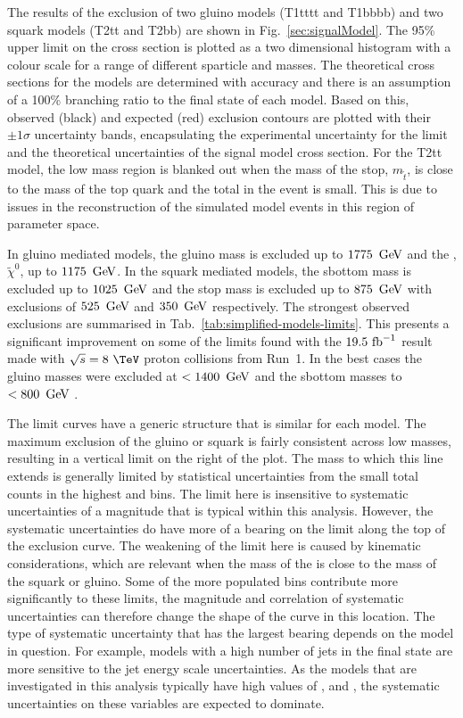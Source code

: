 The results of the exclusion of two gluino models (T1tttt and T1bbbb)
and two squark models (T2tt and T2bb) are shown in
Fig.~\ref{sec:signalModel}. The 95\% \CL upper limit on the cross
section is plotted as a two dimensional histogram with a colour scale
for a range of different sparticle and \LSP masses. The theoretical
cross sections for the models are determined with \NLO
accuracy and there is an assumption of a 100\% branching ratio to the
final state of each model. Based on this, observed (black) and
expected (red) exclusion contours are plotted with their $\pm1\sigma$
uncertainty bands, encapsulating the experimental uncertainty for the
limit and the theoretical uncertainties of the signal model cross
section. For the T2tt model, the low mass region is blanked out when
the mass of the stop, $m_{\tilde{t}}$, is close to the mass of the top
quark and the total \MET in the event is small. This is due to issues
in the \MET reconstruction of the simulated \SUSY model events in this
region of parameter space.

In gluino mediated models, the gluino mass is excluded up to 
$1775~\mathrm{\,Ge\kern -0.1em V}$ and the \LSP, $\tilde{\chi}^0$, up to $1175~\mathrm{\,Ge\kern -0.1em V}$. In the
squark mediated models, the sbottom mass is excluded up to $1025~\mathrm{\,Ge\kern -0.1em V}$
and the stop mass is excluded up to $875~\mathrm{\,Ge\kern -0.1em V}$ with \LSP exclusions of
$525~\mathrm{\,Ge\kern -0.1em V}$ and $350~\mathrm{\,Ge\kern -0.1em V}$ respectively. The strongest observed
exclusions are summarised in Tab.~\ref{tab:simplified-models-limits}.
This presents a significant improvement on some of the limits found
with the $19.5~\text{fb}^{-1}$ result made with $\sqrt{s}=8~\tev$ proton
collisions from Run~1. In the best cases the gluino masses were
excluded at $<1400~\mathrm{\,Ge\kern -0.1em V}$ and the sbottom masses to $<800~\mathrm{\,Ge\kern -0.1em V}$
\cite{smsTwiki}.

The limit curves have a generic structure that is similar for each
model. The maximum exclusion of the gluino or squark is fairly
consistent across low \LSP masses, resulting in a vertical limit on the
right of the plot. The mass to which this line extends is generally
limited by statistical uncertainties from the small total counts in
the highest \HT and \MHT bins. The limit here is insensitive to systematic
uncertainties of a magnitude that is typical within this analysis.
However, the systematic uncertainties do have more of a bearing on the
limit along the top of the exclusion curve. The weakening of the limit
here is caused by kinematic considerations, which are relevant when
the mass of the \LSP is close to the mass of the squark or gluino. Some
of the more populated bins contribute more significantly to these
limits, the
magnitude and correlation of systematic uncertainties can therefore change the
shape of the curve in this location. The type of systematic
uncertainty that has the largest bearing depends on the model in
question. For example, \SUSY models with a high number of jets in the
final state are more sensitive to the jet energy scale uncertainties.
As the \SUSY models that are investigated in this analysis typically
have high values of \nb, \nj and \MHT, the systematic uncertainties on
these variables are expected to dominate.

